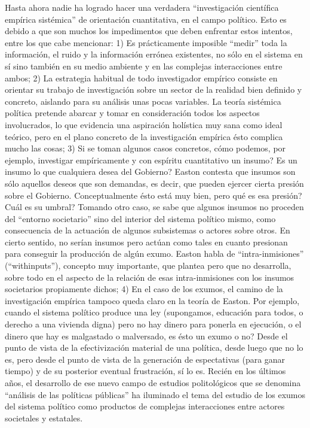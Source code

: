 \documentclass[
]{book}
\begin{document}
Hasta ahora nadie ha logrado hacer una verdadera ``investigación científica empírica sistémica'' de orientación cuantitativa, en el campo político. Esto es debido a que son muchos los impedimentos que deben enfrentar estos intentos, entre los que cabe mencionar: 1) Es prácticamente imposible ``medir'' toda la información, el ruido y la información errónea existentes, no sólo en el sistema en sí sino también en su medio ambiente y en las complejas interacciones entre ambos; 2) La estrategia habitual de todo investigador empírico consiste en orientar su trabajo de investigación sobre un sector de la realidad bien definido y concreto, aislando para su análisis unas pocas variables. La teoría sistémica política pretende abarcar y tomar en consideración todos los aspectos involucrados, lo que evidencia una aspiración holística muy sana como ideal teórico, pero en el plano concreto de la investigación empírica ésto complica mucho las cosas; 3) Si se toman algunos casos concretos, cómo podemos, por ejemplo, investigar empíricamente y con espíritu cuantitativo un insumo? Es un insumo lo que cualquiera desea del Gobierno? Easton contesta que insumos son sólo aquellos deseos que son demandas, es decir, que pueden ejercer cierta presión sobre el Gobierno. Conceptualmente ésto está muy bien, pero qué es esa presión? Cuál es su umbral? Tomando otro caso, se sabe que algunos insumos no proceden del ``entorno societario'' sino del interior del sistema político mismo, como consecuencia de la actuación de algunos subsistemas o actores sobre otros. En cierto sentido, no serían insumos pero actúan como tales en cuanto presionan para conseguir la producción de algún exumo. Easton habla de ``intra-inmisiones'' (``withinputs''), concepto muy importante, que plantea pero que no desarrolla, sobre todo en el aspecto de la relación de esas intra-inmisiones con los insumos societarios propiamente dichos; 4) En el caso de los exumos, el camino de la investigación empírica tampoco queda claro en la teoría de Easton. Por ejemplo, cuando el sistema político produce una ley (supongamos, educación para todos, o derecho a una vivienda digna) pero no hay dinero para ponerla en ejecución, o el dinero que hay es malgastado o malversado, es ésto un exumo o no? Desde el punto de vista de la efectivización material de una política, desde luego que no lo es, pero desde el punto de vista de la generación de espectativas (para ganar tiempo) y de su posterior eventual frustración, sí lo es. Recién en los últimos años, el desarrollo de ese nuevo campo de estudios politológicos que se denomina ``análisis de las políticas públicas'' ha iluminado el tema del estudio de los exumos del sistema político como productos de complejas interacciones entre actores societales y estatales.
\end{document}
